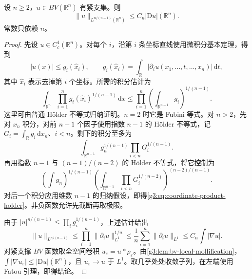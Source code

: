 \begin{theorem}\label{g3:thm:bv-sobolev-basic}
	设 \(n\ge2\)，\(u\in BV(\mathbb R^n)\) 有紧支集。则
	\begin{equation}\label{g3:eq:bv-sobolev-basic}
		\|u\|_{L^{n/(n-1)}(\mathbb R^n)}
		\le C_n|\mathrm Du|(\mathbb R^n).
	\end{equation}
	常数只依赖 \(n\)。
\end{theorem}
\begin{proof}
	先设 \(u\in C_c^1(\mathbb R^n)\)。对每个 \(i\)，沿第 \(i\) 条坐标直线使用微积分基本定理，得到
	\[
		|u(x)|\le g_i(\widehat x_i),\qquad
		g_i(\widehat x_i)=\int_{\mathbb R}|\partial_i u(x_1,\ldots,t,\ldots,x_n)|\,\mathrm dt,
	\]
	其中 \(\widehat x_i\) 表示去掉第 \(i\) 个坐标。所需的积分估计为
	\begin{equation}\label{g3:eq:coordinate-product-holder}
		\int_{\mathbb R^n}\prod_{i=1}^n g_i(\widehat x_i)^{1/(n-1)}\,\mathrm dx
		\le\prod_{i=1}^n\left(\int_{\mathbb R^{n-1}}g_i\right)^{1/(n-1)}.
	\end{equation}
	这里可由普通 Hölder 不等式归纳证明。\(n=2\) 时它是 Fubini 等式。对 \(n>2\)，先对 \(x_n\) 积分，对前 \(n-1\) 个因子使用指数 \(n-1\) 的 Hölder 不等式，记
	\(G_i=\int_{\mathbb R}g_i\,\mathrm dx_n\)、\(i<n\)。剩下的积分至多为
	\[
		\int_{\mathbb R^{n-1}}g_n^{1/(n-1)}
		\prod_{i<n}G_i^{1/(n-1)}.
	\]
	再用指数 \(n-1\) 与 \((n-1)/(n-2)\) 的 Hölder 不等式，将它控制为
	\[
		\left(\int g_n\right)^{1/(n-1)}
		\left(\int_{\mathbb R^{n-1}}\prod_{i<n}G_i^{1/(n-2)}\right)^{(n-2)/(n-1)}.
	\]
	对后一个积分应用维数 \(n-1\) 的归纳假设，即得\eqref{g3:eq:coordinate-product-holder}。非负函数允许先截断再取极限。

	由于 \(|u|^{n/(n-1)}\le\prod_i g_i^{1/(n-1)}\)，上述估计给出
	\[
		\|u\|_{L^{n/(n-1)}}\le
		\prod_{i=1}^n\|\partial_i u\|_{L^1}^{1/n}
		\le \frac1n\sum_{i=1}^n\|\partial_i u\|_{L^1}
		\le C_n\int|\nabla u|.
	\]
	对紧支撑 \(BV\) 函数取全空间卷积 \(u_\varepsilon=u*\rho_\varepsilon\)。由\cref{g3:lem:bv-local-mollification}，
	\(\int|\nabla u_\varepsilon|\le|\mathrm Du|(\mathbb R^n)\)，且 \(u_\varepsilon\to u\) 于 \(L^1\)。取几乎处处收敛子列，在左端使用 Fatou 引理，即得结论。
\end{proof}

